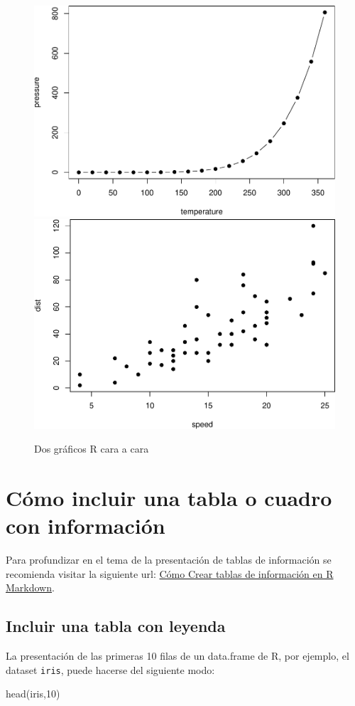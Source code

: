 \documentclass[12pt,a4paper,oneside,]{book}
\newenvironment{Shaded}{\begin{snugshade}}{\end{snugshade}}
\newcommand{\DecValTok}[1]{\textcolor[rgb]{0.00,0.00,0.81}{#1}}
\newcommand{\FunctionTok}[1]{\textcolor[rgb]{0.00,0.00,0.00}{#1}}
\newcommand{\NormalTok}[1]{#1}
\numberwithin{dummy}{section}
\theoremstyle{ocrenumbox}
\theoremstyle{blacknumex}
\theoremstyle{blacknumbox}
\theoremstyle{ocrenum}
\theoremstyle{ocrenum}
\begin{document}
\begin{figure}[htbp]

{\centering \includegraphics[width=0.45\linewidth]{figurasR/fig2-1} \includegraphics[width=0.45\linewidth]{figurasR/fig2-2} 

}

\caption{Dos gr\'aficos R cara a cara}\label{fig:fig2}
\end{figure}

\hypertarget{cuxf3mo-incluir-una-tabla-o-cuadro-con-informaciuxf3n}{%
\section{Cómo incluir una tabla o cuadro con
información}\label{cuxf3mo-incluir-una-tabla-o-cuadro-con-informaciuxf3n}}

Para profundizar en el tema de la presentación de tablas de información
se recomienda visitar la siguiente url:
\href{http://destio.us.es/calvo/post/como-crear-tablas-de-informacion-en-r-markdown/}{Cómo
Crear tablas de información en R Markdown}.

\hypertarget{incluir-una-tabla-con-leyenda}{%
\subsection{Incluir una tabla con
leyenda}\label{incluir-una-tabla-con-leyenda}}

La presentación de las primeras 10 filas de un data.frame de R, por
ejemplo, el dataset \texttt{iris}, puede hacerse del siguiente modo:

\begin{Shaded}
\begin{Highlighting}[]
\FunctionTok{head}\NormalTok{(iris,}\DecValTok{10}\NormalTok{)}
\end{Highlighting}
\end{Shaded}
\end{document}
